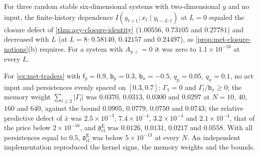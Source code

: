 \begin{numcheck}\label{chk:met-closure-notions}
For three random stable six-dimensional systems with two-dimensional $y$ and no input, the finite-history dependence $I(y_{t+1};x_t\mid y_{t-L:t})$ at $L=0$ equaled the closure defect of \cref{thm:agy-closure-identity} ($1.00556$, $0.73105$ and $0.27781$) and decreased with $L$ (at $L=8$: $0.58140$, $0.42157$ and $0.24497$), as \cref{prop:met-closure-notions}(b) requires. For a system with $A_{y\perp}=0$ it was zero to $1.1\times10^{-16}$ at every $L$.
\end{numcheck}

\begin{numcheck}\label{chk:met-traders}
For \cref{ex:met-traders} with $\mathsf f_p=0.9$, $\mathsf b_p=0.3$, $\mathsf b_x=-0.5$, $q_p=0.05$, $q_x=0.1$, no act input and persistences evenly spaced on $[0.3,0.7]$: $\Gamma_1=0$ and $\Gamma_l/\mathsf b_x\ge0$; the memory weight $\sum_{l\ge2}\lvert\Gamma_l\rvert$ was $0.0370$, $0.0313$, $0.0300$ and $0.0297$ at $N=10$, $40$, $160$ and $640$, against the bound $0.0905$, $0.0779$, $0.0750$ and $0.0743$; the relative predictive defect of $\bar x$ was $2.5\times10^{-3}$, $7.4\times10^{-4}$, $3.2\times10^{-4}$ and $2.1\times10^{-4}$, that of the price below $2\times10^{-16}$, and $\mathfrak d^{\mathrm E}_{\mathrm{cl}}$ was $0.0126$, $0.0131$, $0.0217$ and $0.0558$. With all persistences equal to $0.5$, $\mathfrak d^{\mathrm E}_{\mathrm{cl}}$ was below $5\times10^{-13}$ at every $N$. An independent implementation reproduced the kernel signs, the memory weights and the bounds.
\end{numcheck}


